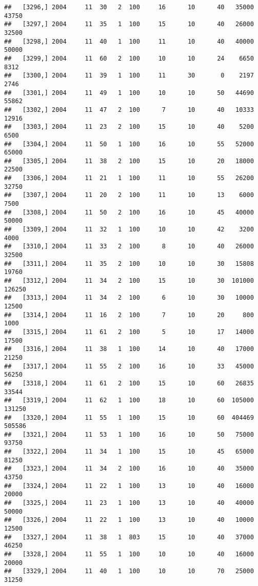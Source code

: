 \documentclass{article}\usepackage[]{graphicx}\usepackage[]{color}
\makeatletter
\newenvironment{kframe}{%
 \def\at@end@of@kframe{}%
 \ifinner\ifhmode%
  \def\at@end@of@kframe{\end{minipage}}%
  \begin{minipage}{\columnwidth}%
 \fi\fi%
 \def\FrameCommand##1{\hskip\@totalleftmargin \hskip-\fboxsep
 \colorbox{shadecolor}{##1}\hskip-\fboxsep
     \hskip-\linewidth \hskip-\@totalleftmargin \hskip\columnwidth}%
 \MakeFramed {\advance\hsize-\width
   \@totalleftmargin\z@ \linewidth\hsize
   \@setminipage}}%
 {\par\unskip\endMakeFramed%
 \at@end@of@kframe}
\newenvironment{knitrout}{}{} %
\makeatother
\begin{document}
\begin{knitrout}
\begin{kframe}
\begin{verbatim}
##   [3296,] 2004     11  30   2  100     16      10      40   35000   43750
##   [3297,] 2004     11  35   1  100     15      10      40   26000   32500
##   [3298,] 2004     11  40   1  100     11      10      40   40000   50000
##   [3299,] 2004     11  60   2  100     10      10      24    6650    8312
##   [3300,] 2004     11  39   1  100     11      30       0    2197    2746
##   [3301,] 2004     11  49   1  100     10      10      50   44690   55862
##   [3302,] 2004     11  47   2  100      7      10      40   10333   12916
##   [3303,] 2004     11  23   2  100     15      10      40    5200    6500
##   [3304,] 2004     11  50   1  100     16      10      55   52000   65000
##   [3305,] 2004     11  38   2  100     15      10      20   18000   22500
##   [3306,] 2004     11  21   1  100     11      10      55   26200   32750
##   [3307,] 2004     11  20   2  100     11      10      13    6000    7500
##   [3308,] 2004     11  50   2  100     16      10      45   40000   50000
##   [3309,] 2004     11  32   1  100     10      10      42    3200    4000
##   [3310,] 2004     11  33   2  100      8      10      40   26000   32500
##   [3311,] 2004     11  35   2  100     10      10      30   15808   19760
##   [3312,] 2004     11  34   2  100     15      10      30  101000  126250
##   [3313,] 2004     11  34   2  100      6      10      30   10000   12500
##   [3314,] 2004     11  16   2  100      7      10      20     800    1000
##   [3315,] 2004     11  61   2  100      5      10      17   14000   17500
##   [3316,] 2004     11  38   1  100     14      10      40   17000   21250
##   [3317,] 2004     11  55   2  100     16      10      33   45000   56250
##   [3318,] 2004     11  61   2  100     15      10      60   26835   33544
##   [3319,] 2004     11  62   1  100     18      10      60  105000  131250
##   [3320,] 2004     11  55   1  100     15      10      60  404469  505586
##   [3321,] 2004     11  53   1  100     16      10      50   75000   93750
##   [3322,] 2004     11  34   1  100     15      10      45   65000   81250
##   [3323,] 2004     11  34   2  100     16      10      40   35000   43750
##   [3324,] 2004     11  22   1  100     13      10      40   16000   20000
##   [3325,] 2004     11  23   1  100     13      10      40   40000   50000
##   [3326,] 2004     11  22   1  100     13      10      40   10000   12500
##   [3327,] 2004     11  38   1  803     15      10      40   37000   46250
##   [3328,] 2004     11  55   1  100     10      10      40   16000   20000
##   [3329,] 2004     11  40   1  100     10      10      70   25000   31250

\end{verbatim}
\end{kframe}
\end{knitrout}
\end{document}
